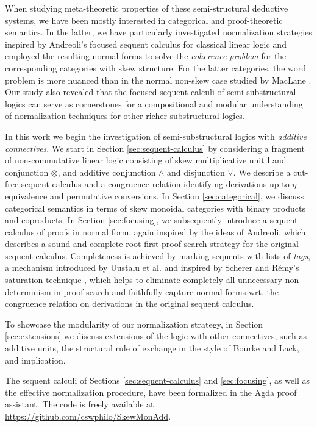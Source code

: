 \documentclass[submission,copyright,creativecommons]{eptcs}
\theoremstyle{definition}
\newcommand{\ot}{\otimes}
\newcommand{\I}{\mathsf{I}}
\begin{document}
When studying meta-theoretic properties of these semi-structural deductive systems, we have been mostly interested in categorical and proof-theoretic semantics. In the latter, we have particularly investigated normalization strategies inspired by Andreoli's focused sequent calculus for classical linear logic \cite{andreoli:logic:1992} and employed the resulting normal forms to solve the \emph{coherence problem} for the corresponding categories with skew structure. For the latter categories, the word problem is more nuanced than in the normal non-skew case studied by MacLane \cite{maclane1963natural}. Our study also revealed that the focused sequent calculi of semi-substructural logics can serve as cornerstones for a compositional and modular understanding of normalization techniques for other richer substructural logics.

In this work we begin the investigation of  semi-substructural logics with \emph{additive connectives}. We start in Section \ref{sec:sequent-calculus} by considering a fragment of non-commutative linear logic consisting of skew multiplicative unit $\I$ and conjunction $\ot$, and additive conjunction $\land$ and disjunction $\lor$. We describe a cut-free sequent calculus and a congruence relation identifying derivations up-to $\eta$-equivalence and permutative conversions. In Section \ref{sec:categorical}, we discuss categorical semantics in terms of skew monoidal categories with binary products and coproducts. In Section \ref{sec:focusing}, we subsequently introduce a sequent calculus of proofs in normal form, again inspired by the ideas of Andreoli, which describes a sound and complete root-first proof search strategy for the original sequent calculus. Completeness is achieved by marking sequents with lists of \emph{tags}, a mechanism introduced by Uustalu et al. \cite{UVW:protsn} and inspired by Scherer and R{\'e}my's saturation technique \cite{scherer:simple:2015}, which helps to  eliminate completely all unnecessary non-determinism in proof search and faithfully capture normal forms wrt. the congruence relation on derivations in the original sequent calculus. %

To showcase the modularity of our normalization strategy, in Section \ref{sec:extensions} we discuss extensions of the logic with other connectives, such as additive units, the structural rule of exchange in the style of Bourke and Lack, and implication.

The sequent calculi of Sections \ref{sec:sequent-calculus} and \ref{sec:focusing}, as well as the effective normalization procedure, have been formalized in the Agda proof assistant. The code is freely available at
  \url{https://github.com/cswphilo/SkewMonAdd}.
\end{document}
